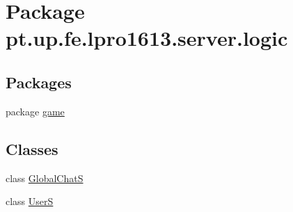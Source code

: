 \hypertarget{namespacept_1_1up_1_1fe_1_1lpro1613_1_1server_1_1logic}{}\section{Package pt.\+up.\+fe.\+lpro1613.\+server.\+logic}
\label{namespacept_1_1up_1_1fe_1_1lpro1613_1_1server_1_1logic}
\subsection*{Packages}
\begin{DoxyCompactItemize}
\item 
package \hyperlink{namespacept_1_1up_1_1fe_1_1lpro1613_1_1server_1_1logic_1_1game}{game}
\end{DoxyCompactItemize}
\subsection*{Classes}
\begin{DoxyCompactItemize}
\item 
class \hyperlink{classpt_1_1up_1_1fe_1_1lpro1613_1_1server_1_1logic_1_1_global_chat_s}{Global\+ChatS}
\item 
class \hyperlink{classpt_1_1up_1_1fe_1_1lpro1613_1_1server_1_1logic_1_1_user_s}{UserS}
\end{DoxyCompactItemize}
